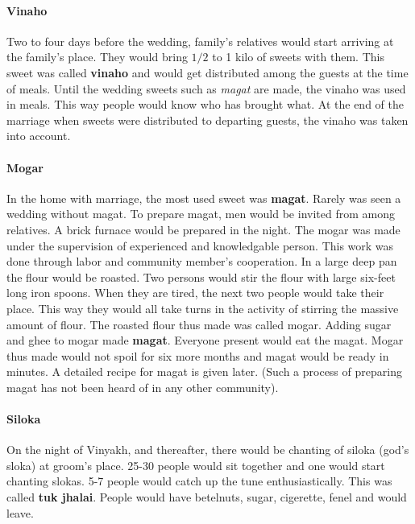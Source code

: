 \paragraph{Vinaho} Two to four days before the wedding, family's relatives
would start arriving at the family's place. They would bring $1/2$ to 1 kilo of
sweets with them. This sweet was called \textbf{vinaho} and would get
distributed among the guests at the time of meals. Until the wedding sweets
such as \textit{magat} are made, the vinaho was used in meals. This way people
would know who has brought what. At the end of the marriage when sweets were
distributed to departing guests, the vinaho was taken into account.

\paragraph{Mogar} In the home with marriage, the most used sweet was
\textbf{magat}. Rarely was seen a wedding without magat. To prepare magat, men
would be invited from among relatives. A brick furnace would be prepared in the
night. The mogar was made under the supervision of experienced and knowledgable
person. This work was done through labor and community member's cooperation. In
a large deep pan the flour would be roasted. Two persons would stir the flour
with large six-feet long iron spoons. When they are tired, the next two people
would take their place. This way they would all take turns in the activity of
stirring the massive amount of flour. The roasted flour thus made was called
mogar. Adding sugar and ghee to mogar made \textbf{magat}. Everyone present
would eat the magat. Mogar thus made would not spoil for six more months and
magat would be ready in minutes. A detailed recipe for magat is given later.
(Such a process of preparing magat has not been heard of in any other
community).

\paragraph{Siloka} On the night of Vinyakh, and thereafter, there would be
chanting of siloka (god's sloka) at groom's place. 25-30 people would sit
together and one would start chanting slokas. 5-7 people would catch up the
tune enthusiastically. This was called \textbf{tuk jhalai}. People would have
betelnuts, sugar, cigerette, fenel and would leave.

